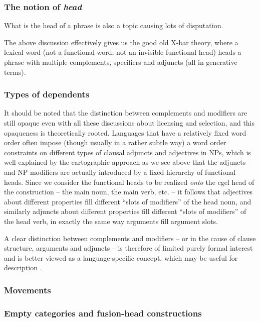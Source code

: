 \documentclass[../main.tex]{subfiles}
\begin{document}
\subsubsection{The notion of \emph{head}}\label{sec:headedness}

What is the head of a phrase is also a topic causing lots of disputation. 

The above discussion effectively gives us the good old X-bar theory, where a lexical word (not a functional word, 
not an invisible functional head) heads a phrase with multiple complements, specifiers and adjuncts (all in 
generative terms).

\subsubsection{Types of dependents}

It should be noted that the distinction between complements and modifiers are still opaque even with 
all these discussions about licensing and selection, and this opaqueness is theoretically rooted. 
Languages that have a relatively fixed word order often impose (though usually in a rather subtle way) 
a word order constraints on different types of clausal adjuncts and adjectives in NPs, 
which is well explained by the cartographic approach as we see above that the adjuncts and NP modifiers 
are actually introduced by a fixed hierarchy of functional heads. Since we consider the functional heads 
to be realized \emph{onto} the \ac{cgel} head of the construction -- the main noun, the main verb, etc. -- 
it follows that adjectives about different properties fill different ``slots of modifiers'' of the head noun, 
and similarly adjuncts about different properties fill different ``slots of modifiers'' of the head verb, 
in exactly the same way arguments fill argument slots. 

A clear distinction between complements and modifiers -- or in the cause of clause structure, arguments and
adjuncts -- is therefore of limited purely formal interest and is better viewed as a language-specific concept, 
which may be useful for description \citep{haspelmath2014arguments}. 

\subsubsection{Movements}

\subsubsection{Empty categories and fusion-head constructions}
\end{document}
